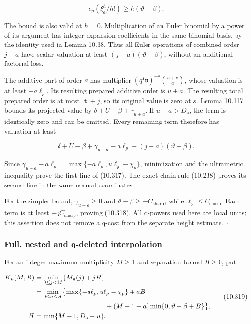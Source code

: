 \documentclass[
  11pt,
  a4paper,
]{article}
\begin{document}
\[
v_p(\xi_a^h/h!)\ge h(\vartheta-\beta).
\]

The bound is also valid at \(h=0\). Multiplication of an Euler binomial
by a power of its argument has integer expansion coefficients in the
same binomial basis, by the identity used in Lemma 10.38. Thus all Euler
operations of combined order \(j-a\) have scalar valuation at least
\((j-a)(\vartheta-\beta)\), without an additional factorial loss.

The additive part of order \(a\) has multiplier
\((q^I\mathfrak v)^{-a}\binom{u+a}{a}\), whose valuation is at least
\(-a\ell_p\). Its resulting prepared additive order is \(u+a\). The
resulting total prepared order is at most \(|\boldsymbol t|+j\), so its
original value is zero at \(s\). Lemma 10.117 bounds its projected value
by \(\delta+U-\beta+\gamma_{u+a}\). If \(u+a>D_{\mathrm a}\), the term
is identically zero and can be omitted. Every remaining term therefore
has valuation at least

\[
\delta+U-\beta+\gamma_{u+a}-a\ell_p
+(j-a)(\vartheta-\beta).
\]

Since \(\gamma_{u+a}-a\ell_p=\max\{-a\ell_p,u\ell_p-\chi_p\}\),
minimization and the ultrametric inequality prove the first line of
(10.317). The exact chain rule (10.238) proves its second line in the
same normal coordinates.

For the simpler bound, \(\gamma_{u+a}\ge0\) and
\(\vartheta-\beta\ge-C_{\mathrm{sharp}}\), while
\(\ell_p\le C_{\mathrm{sharp}}\). Each term is at least
\(-jC_{\mathrm{sharp}}\), proving (10.318). All q-powers used here are
local units; this assertion does not remove a q-cost from the separate
height estimate. \(\square\)

\subsubsection{Full, nested and q-deleted
interpolation}\label{full-nested-and-q-deleted-interpolation}

For an integer maximum multiplicity \(M\ge1\) and separation bound
\(B\ge0\), put

\[
\begin{aligned}
K_u(M,B)&=\min_{0\le j<M}\{M_u(j)+jB\}\\
&=\min_{0\le a\le H}
\bigl\{\max\{-a\ell_p,u\ell_p-\chi_p\}+aB\\
&\hspace{37mm}+(M-1-a)\min\{0,\vartheta-\beta+B\}\bigr\},\\
H&=\min\{M-1,D_{\mathrm a}-u\}.
\end{aligned}
\tag{10.319}
\]
\end{document}
